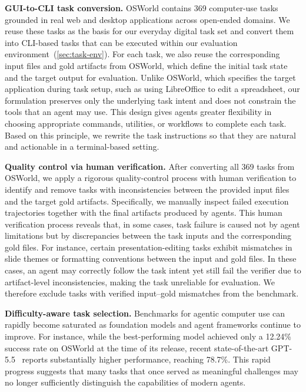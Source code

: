 \noindent\textbf{GUI-to-CLI task conversion.}
OSWorld contains 369 computer-use tasks grounded in real web and desktop applications across open-ended domains. We reuse these tasks as the basis for our everyday digital task set and convert them into CLI-based tasks that can be executed within our evaluation environment~(\cref{sec:task-env}). For each task, we also reuse the corresponding input files and gold artifacts from OSWorld, which define the initial task state and the target output for evaluation. Unlike OSWorld, which specifies the target application during task setup, such as using LibreOffice to edit a spreadsheet, our formulation preserves only the underlying task intent and does not constrain the tools that an agent may use. This design gives agents greater flexibility in choosing appropriate commands, utilities, or workflows to complete each task. Based on this principle, we rewrite the task instructions so that they are natural and actionable in a terminal-based setting.

\noindent\textbf{Quality control via human verification.}
After converting all 369 tasks from OSWorld, we apply a rigorous quality-control process with human verification to identify and remove tasks with inconsistencies between the provided input files and the target gold artifacts.
% 
Specifically, we manually inspect failed execution trajectories together with the final artifacts produced by agents. This human verification process reveals that, in some cases, task failure is caused not by agent limitations but by discrepancies between the task inputs and the corresponding gold files. For instance, certain presentation-editing tasks exhibit mismatches in slide themes or formatting conventions between the input and gold files. In these cases, an agent may correctly follow the task intent yet still fail the verifier due to artifact-level inconsistencies, making the task unreliable for evaluation. We therefore exclude tasks with verified input--gold mismatches from the benchmark.


\noindent\textbf{Difficulty-aware task selection.}
Benchmarks for agentic computer use can rapidly become saturated as foundation models and agent frameworks continue to improve. For instance, while the best-performing model achieved only a 12.24\% success rate on OSWorld at the time of its release, recent state-of-the-art GPT-5.5~\citep{openai2026introducinggpt55} reports substantially higher performance, reaching 78.7\%. This rapid progress suggests that many tasks that once served as meaningful challenges may no longer sufficiently distinguish the capabilities of modern agents. 



